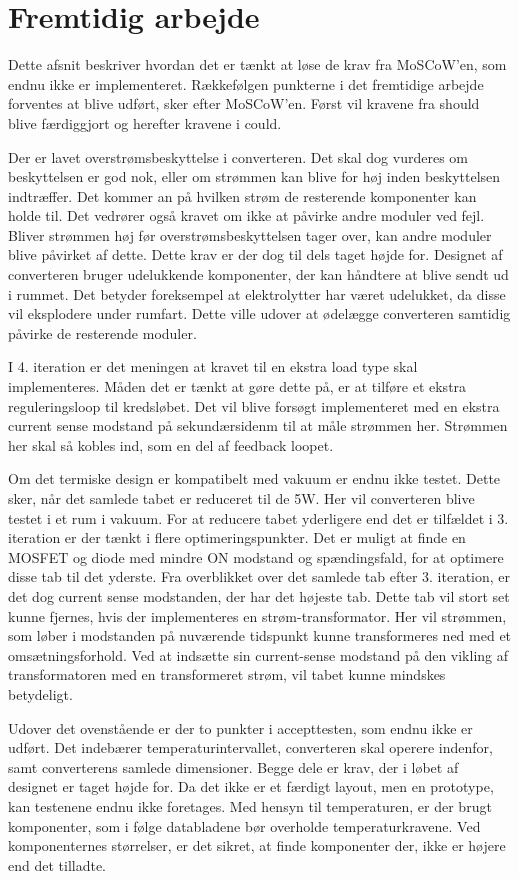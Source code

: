 \chapter{Fremtidig arbejde}
Dette afsnit beskriver hvordan det er tænkt at løse de krav fra MoSCoW'en, som endnu ikke er implementeret. Rækkefølgen punkterne i det fremtidige arbejde forventes at blive udført, sker efter MoSCoW'en. Først vil kravene fra should blive færdiggjort og herefter kravene i could.  

Der er lavet overstrømsbeskyttelse i converteren. Det skal dog vurderes om beskyttelsen er god nok, eller om strømmen kan blive for høj inden beskyttelsen indtræffer. Det kommer an på hvilken strøm de resterende komponenter kan holde til. Det vedrører også kravet om ikke at påvirke andre moduler ved fejl. Bliver strømmen høj før overstrømsbeskyttelsen tager over, kan andre moduler blive påvirket af dette. Dette krav er der dog til dels taget højde for. Designet af converteren bruger udelukkende komponenter, der kan håndtere at blive sendt ud i rummet. Det betyder foreksempel at elektrolytter har været udelukket, da disse vil eksplodere under rumfart. Dette ville udover at ødelægge converteren samtidig påvirke de resterende moduler.

I 4. iteration er det meningen at kravet til en ekstra load type skal implementeres. Måden det er tænkt at gøre dette på, er at tilføre et ekstra reguleringsloop til kredsløbet. Det vil blive forsøgt implementeret med en ekstra current sense modstand på sekundærsidenm til at måle strømmen her. Strømmen her skal så kobles ind, som en del af feedback loopet.

Om det termiske design er kompatibelt med vakuum er endnu ikke testet. Dette sker, når det samlede tabet er reduceret til de 5W. Her vil converteren blive testet i et rum i vakuum. For at reducere tabet yderligere end det er tilfældet i 3. iteration er der tænkt i flere optimeringspunkter. Det er muligt at finde en MOSFET og diode med mindre ON modstand og spændingsfald, for at optimere disse tab til det yderste. 
Fra overblikket over det samlede tab efter 3. iteration, er det dog current sense modstanden, der har det højeste tab. Dette tab vil stort set kunne fjernes, hvis der implementeres en strøm-transformator. Her vil strømmen, som løber i modstanden på nuværende tidspunkt kunne transformeres ned med et omsætningsforhold. Ved at indsætte sin current-sense modstand på den vikling af transformatoren med en transformeret strøm, vil tabet kunne mindskes betydeligt.  

Udover det ovenstående er der to punkter i accepttesten, som endnu ikke er udført. Det indebærer temperaturintervallet, converteren skal operere indenfor, samt converterens samlede dimensioner. Begge dele er krav, der i løbet af designet er taget højde for. Da det ikke er et færdigt layout, men en prototype, kan testenene endnu ikke foretages. Med hensyn til temperaturen, er der brugt komponenter, som i følge databladene bør overholde temperaturkravene. Ved komponenternes størrelser, er det sikret, at finde komponenter der, ikke er højere end det tilladte.    


